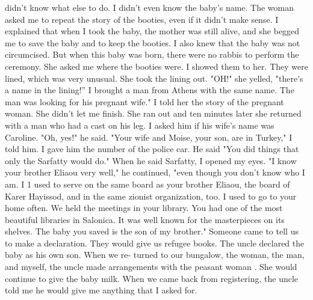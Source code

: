 didn't know what else to do. I didn't even know the baby's name. The woman asked me to repeat the story of the booties, even if it didn't make sense. I explained that when I took the baby, the mother was still alive, and she begged me to save the baby and to keep the booties. I also knew 
that the baby was not circumcised. But when this baby was born, there were no rabbis to perform the ceremony. 
She asked me where the booties were. I showed them to her. They 
were lined, which was very unusual. She took the lining out. "OH!" she 
yelled, "there's a name in the lining!” I brought a man from Athens with 
the same name. The man was looking for his pregnant wife." I told her 
the story of the pregnant woman. She didn't let me finish. She ran out 
and ten minutes later she returned with a man who had a cast on his leg. 
I asked him if his wife's name was Caroline. "Oh, yes!" he said. "Your 
wife and Moise, your son, are in Turkey," I told him. I gave him the 
number of the police car. He said "You did things that only the Sarfatty 
would do." When he said Sarfatty, I opened my eyes. "I know your brother 
Eliaou very well," he continued, "even though you don't know who I am. I 
1 
used to serve on the same board as your brother Eliaou, the board of Karer 
Hayissod, and in the same zionist organization, too. I used to go to your 
home often. We held the meetings in your library. You had one of the 
most beautiful libraries in Salonica. It was well known for the masterpieces on its shelves. The baby you saved is the son of my brother." Someone came to tell us to make a declaration. They would give us refugee books. The uncle declared the baby as his own son. When we re-
turned to our bungalow, the woman, the man, and myself, the uncle made 
arrangements with the peasant woman . She would continue to give the baby milk. When we came back from registering, the uncle told me he would give me anything that I asked for. 


